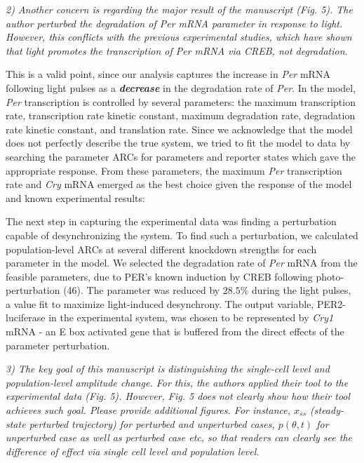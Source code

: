 \documentclass[11pt, letterpaper]{article}
\newenvironment{reviewer}{\itshape\color{gray}}{}
\newenvironment{manuscript}[1]{\begin{center}\begin{tcolorbox}[colback=green!5!white,colframe=green!75!black,width=0.8\textwidth,title={#1},breakable,fonttitle=\bfseries]}{\end{tcolorbox}\end{center}}
\begin{document}
\begin{reviewer}
2) Another concern is regarding the major result of the manuscript (Fig. 5). The author perturbed the degradation of Per mRNA parameter in response to light. However, this conflicts with the previous experimental studies, which have shown that light promotes the transcription of Per mRNA via CREB, not degradation. 
\end{reviewer}

This is a valid point, since our analysis captures the increase in {\itshape Per} mRNA following light pulses as a {\itshape\bfseries decrease} in the degradation rate of {\itshape Per}.
In the model, {\itshape Per} transcription is controlled by several parameters: the maximum transcription rate, transcription rate kinetic constant, maximum degradation rate, degradation rate kinetic constant, and translation rate.
Since we acknowledge that the model does not perfectly describe the true system, we tried to fit the model to data by searching the parameter ARCs for parameters and reporter states which gave the appropriate response. 
From these parameters, the maximum {\itshape Per} transcription rate and {\itshape Cry} mRNA emerged as the best choice given the response of the model and known experimental results:

\begin{manuscript}{Page 16}
The next step in capturing the experimental data was finding a perturbation capable of desynchronizing the system.
To find such a perturbation, we calculated population-level ARCs at several different knockdown strengths for each parameter in the model.
We selected the degradation rate of {\itshape Per} mRNA from the feasible parameters, due to PER's known induction by CREB following photo-perturbation (46).
The parameter was reduced by $28.5\%$ during the light pulses, a value fit to maximize light-induced desynchrony.
The output variable, PER2-luciferase in the experimental system, was chosen to be represented by {\itshape Cry1} mRNA - an E box activated gene that is buffered from the direct effects of the parameter perturbation.
\end{manuscript}


\begin{reviewer}
3) The key goal of this manuscript is distinguishing the single-cell level and population-level amplitude change. For this, the authors applied their tool to the experimental data (Fig. 5). However, Fig. 5 does not clearly show how their tool achieves such goal. Please provide additional figures. For instance, $x_{ss}$ (steady-state perturbed trajectory) for perturbed and unperturbed cases, $p(\theta, t)$ for unperturbed case as well as perturbed case etc, so that readers can clearly see the difference of effect via single cell level and population level.  
\end{reviewer}
\end{document}
